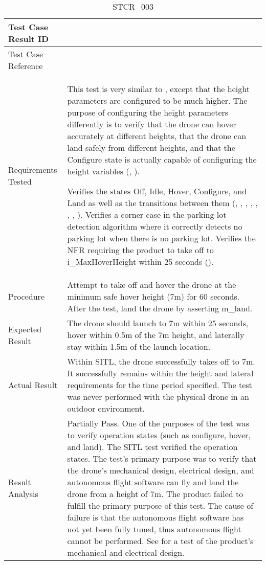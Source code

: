 \documentclass[12pt, titlepage]{article}
\begin{document}
\begin{table}[!h]
\begin{center}
\caption {STCR\_003}
\label{tab:STCR_003}
\begin{tabular}{ | m{3.2cm} | m{12.2cm} | } 
\hline
Test Case Result ID & \nameref{tab:STCR_003} \\ 
\hline
Test Case Reference & \nameref{tab:STC_003}  \\ 
\hline
Requirements Tested & This test is very similar to \nameref{tab:STC_001}, except that the height parameters are configured to be much higher. The purpose of configuring the height parameters differently is to verify that the drone can hover accurately at different heights, that the drone can land safely from different heights, and that the Configure state is actually capable of configuring the height variables (\nameref{GEN_003}, \nameref{GEN_004}).

Verifies the states Off, Idle, Hover, Configure, and Land as well as the transitions between them (\nameref{STA_000}, \nameref{STA_001}, \nameref{STA_004}, \nameref{STA_005}, \nameref{STA_006}, \nameref{TRANS_002}, \nameref{TRANS_003}, \nameref{TRANS_009}). 
Verifies a corner case in the parking lot detection algorithm where it correctly detects no parking lot when there is no parking lot.
Verifies the NFR requiring the product to take off to i\_MaxHoverHeight within 25 seconds (\nameref{PERF_002}). \\ 
\hline
Procedure & Attempt to take off and hover the drone at the minimum safe hover height (7m) for 60 seconds. After the test, land the drone by asserting m\_land. \\ 
\hline
Expected Result & The drone should launch to 7m within 25 seconds, hover within 0.5m of the 7m height, and laterally stay within 1.5m of the launch location.   \\ 
\hline
Actual Result & Within SITL, the drone successfully takes off to 7m. It successfully remains within the height and lateral requirements for the time period specified. The test was never performed with the physical drone in an outdoor environment.  \\ 
\hline
Result Analysis & Partially Pass. One of the purposes of the test was to verify operation states (such as configure, hover, and land). The SITL test verified the operation states. The test's primary purpose was to verify that the drone's mechanical design, electrical design, and autonomous flight software can fly and land the drone from a height of 7m. The product failed to fulfill the primary purpose of this test. The cause of failure is that the autonomous flight software has not yet been fully tuned, thus autonomous flight cannot be performed. See \nameref{tab:STCR_001} for a test of the product's mechanical and electrical design.  \\ 
\hline
\end{tabular}
\end{center}
\end{table}
\end{document}
